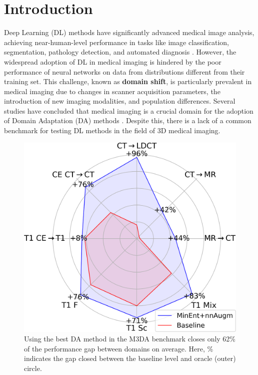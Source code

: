 \section{Introduction}

Deep Learning (DL) methods have significantly advanced medical image analysis, achieving near-human-level performance in tasks like image classification, segmentation, pathology detection, and automated diagnosis \cite{medim_dl_survey_2017}. However, the widespread adoption of DL in medical imaging is hindered by the poor performance of neural networks on data from distributions different from their training set. This challenge, known as \textbf{domain shift}, is particularly prevalent in medical imaging due to changes in scanner acquisition parameters, the introduction of new imaging modalities, and population differences. Several studies have concluded that medical imaging is a crucial domain for the adoption of Domain Adaptation (DA) methods \cite{gulrajani2020search,uda_survey_2020,zhuang2020comprehensive,peng2018visda,zhang2021empirical}. Despite this, there is a lack of a common benchmark for testing DL methods in the field of 3D medical imaging.


\begin{figure}[h]
	\centering
	\includegraphics[width=0.80\linewidth]{Dissertation/Figures/4_da_bench/fig1_teaser.png}
	\caption{Using the best DA method in the M3DA benchmark closes only 62\% of the performance gap between domains on average. Here, \% indicates the gap closed between the baseline level and oracle (outer) circle.}
	\label{fig:teaser1}
\end{figure}


